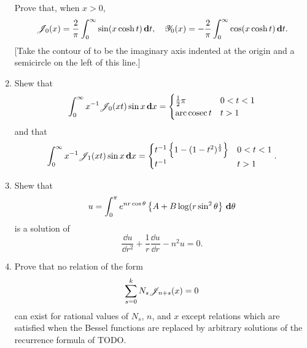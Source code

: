 \documentclass{book}
\begin{document}
\begin{enumerate}
  Prove that, when $x>0$,
  $$
  \mathscr{J}_{0}(x) = \frac{2}{\pi} \int_{0}^{\infty} \sin(x \cosh t)
  \, \mathbf{d} t,
  \quad
  \mathscr{Y}_{0}(x) = -\frac{2}{\pi}
  \int_{0}^{\infty} \cos(x \cosh t)
  \, \mathbf{d} t.
  $$
  [Take the contour of  to be the imaginary axis
  indented at the origin and a semicircle on the left of this line.]
\item
  Shew that
  $$
  \int_{0}^{\infty} x^{-1} \mathscr{J}_{0}(xt) \sin x \, \mathbf{d} x
  =
  \begin{cases}
    \frac{1}{2}\pi & 0 < t < 1
    \\
    \operatorname{arc\,cosec} t & t > 1
  \end{cases}
  $$
  and that
  $$
  \int_{0}^{\infty} x^{-1} \mathscr{J}_{1}(xt) \sin x \, \mathbf{d} x
  =
  \begin{cases}
    t^{-1} \left\{  1 - (1-t^{2})^{\frac{1}{2}}   \right\} & 0 < t < 1
    \\
    t^{-1} & t > 1
  \end{cases}.
  $$
\item
  Shew that
  $$
  u = \int_{0}^{\pi} e^{nr\cos\theta} \left\{ A + B \log(r\sin^{2}\theta \right\} \, \mathbf{d} \theta
  $$
  is a solution of
  $$
  \frac{\dd u}{\dd r^{2}} + \frac{1}{r} \frac{\dd u}{\dd r} - n^{2} u
  = 0.
  $$
\item
  Prove that no relation of the form
  $$
  \sum_{s=0}^{k} N_{s} \mathscr{J}_{n+s}(x) = 0
  $$
  can exist for rational values of $N_{s}$, $n$, and $x$ except
  relations which are satisfied when the Bessel functions are replaced
  by arbitrary solutions of the recurrence formula of TODO.


\end{enumerate}
\end{document}

